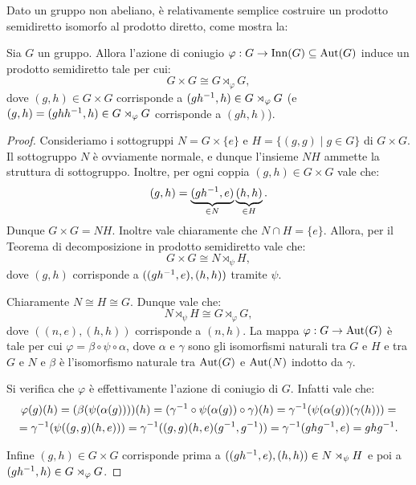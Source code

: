 \documentclass[11pt]{scrartcl}
\begin{document}
	
	Dato un gruppo non abeliano, è relativamente semplice costruire un prodotto
	semidiretto isomorfo al prodotto diretto, come mostra la:
	
	\begin{proposition}
		\label{prop:coniugio_isomorfo}
		Sia $G$ un gruppo. Allora l'azione di coniugio $\varphi : G \to \operatorname{Inn}(G) \subseteq \operatorname{Aut}(G)$ induce un prodotto semidiretto tale per cui:
		\[
		G \times G \cong G \rtimes_\varphi G,
		\]
		dove $(g, h) \in G \times G$ corrisponde a $(gh^{-1}, h) \in G \rtimes_\varphi G$
		(e $(g, h) = (ghh^{-1}, h) \in G \rtimes_\varphi G$ corrisponde a $(gh, h)$).
	\end{proposition}
	
	\begin{proof}
		Consideriamo i sottogruppi $N = G \times \{e\}$ e $H = \{(g, g) \mid g \in G\}$ di
		$G \times G$. Il sottogruppo $N$ è ovviamente normale, e dunque l'insieme
		$NH$ ammette la struttura di sottogruppo. Inoltre, per ogni coppia
		$(g, h) \in G \times G$ vale che:
		\[ (g, h) = \underbrace{(g h^{-1}, e)}_{\in N} \underbrace{(h, h)}_{\in H}. \]
		Dunque $G \times G = NH$. Inoltre vale chiaramente che $N \cap H = \{e\}$.
		Allora, per il Teorema di decomposizione in prodotto
		semidiretto vale che:
		\[ G \times G \cong N \rtimes_\psi H, \]
		dove $(g, h)$ corrisponde a $((g h^{-1}, e), (h, h))$ tramite $\psi$. \medskip
		
		
		Chiaramente $N \cong H \cong G$. Dunque vale che:
		\[ N \rtimes_\psi H \cong G \rtimes_\varphi G, \]
		dove $((n, e), (h, h))$ corrisponde a $(n, h)$. La mappa
		$\varphi : G \to \operatorname{Aut}(G)$ è tale per cui
		$\varphi = \beta \circ \psi \circ \alpha$, dove $\alpha$ e
		$\gamma$ sono gli isomorfismi naturali tra $G$ e $H$ e
		tra $G$ e $N$ e $\beta$ è l'isomorfismo naturale tra $\operatorname{Aut}(G)$ e
		$\operatorname{Aut}(N)$ indotto da $\gamma$. \medskip
		
		
		Si verifica che $\varphi$ è effettivamente l'azione di coniugio di
		$G$. Infatti vale che:
		\begin{multline*}
			\varphi(g)(h) = (\beta(\psi(\alpha(g))))(h) = (\gamma^{-1} \circ \psi(\alpha(g)) \circ \gamma)(h)
			= \gamma^{-1}(\psi(\alpha(g))(\gamma(h))) = \\ = \gamma^{-1}(\psi((g, g)(h, e))) =
			\gamma^{-1}((g, g) (h, e) (g^{-1}, g^{-1}))
			= \gamma^{-1}(ghg^{-1}, e) = ghg^{-1}.
		\end{multline*}
		
		Infine $(g, h) \in G \times G$ corrisponde prima a
		$((gh^{-1}, e), (h, h)) \in N \rtimes_\psi H$ e poi
		a $(gh^{-1}, h) \in G \rtimes_\varphi G$.
	\end{proof}
	
\end{document}
